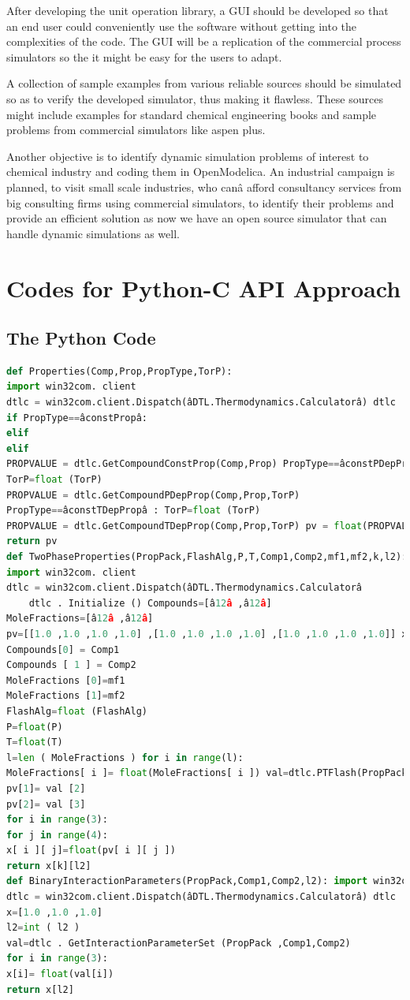 \documentclass[12pt]{report}
\begin{document}
After developing the unit operation library, a GUI should be developed so that an end user could conveniently use the software without getting into the complexities of the code. The GUI will be a replication of the commercial process simulators so the it might be easy for the users to adapt.

A collection of sample examples from various reliable sources should be simulated so as to verify the developed simulator, thus making it flawless. These sources might include examples for standard chemical engineering books and sample problems from commercial simulators like aspen plus.

Another objective is to identify dynamic simulation problems of interest to chemical industry and coding them in OpenModelica. An industrial campaign is planned, to visit small scale industries, who canâ  afford consultancy services from big consulting firms using commercial simulators, to identify their problems and provide an efficient solution as now we have an open source simulator that can handle dynamic simulations as well.

\appendix
\chapter{Codes for Python-C API Approach}
\label{appenA}
\section{The Python Code}
\begin{lstlisting}[language=Python]
def Properties(Comp,Prop,PropType,TorP):
import win32com. client
dtlc = win32com.client.Dispatch(âDTL.Thermodynamics.Calculatorâ) dtlc . Initialize ()
if PropType==âconstPropâ:
elif
elif
PROPVALUE = dtlc.GetCompoundConstProp(Comp,Prop) PropType==âconstPDepPropâ :
TorP=float (TorP)
PROPVALUE = dtlc.GetCompoundPDepProp(Comp,Prop,TorP)
PropType==âconstTDepPropâ : TorP=float (TorP)
PROPVALUE = dtlc.GetCompoundTDepProp(Comp,Prop,TorP) pv = float(PROPVALUE)
return pv
def TwoPhaseProperties(PropPack,FlashAlg,P,T,Comp1,Comp2,mf1,mf2,k,l2):
import win32com. client
dtlc = win32com.client.Dispatch(âDTL.Thermodynamics.Calculatorâ
	dtlc . Initialize () Compounds=[â12â ,â12â]
MoleFractions=[â12â ,â12â]
pv=[[1.0 ,1.0 ,1.0 ,1.0] ,[1.0 ,1.0 ,1.0 ,1.0] ,[1.0 ,1.0 ,1.0 ,1.0]] x=[[1.0 ,1.0 ,1.0 ,1.0] ,[1.0 ,1.0 ,1.0 ,1.0] ,[1.0 ,1.0 ,1.0,1.0]] 
Compounds[0] = Comp1
Compounds [ 1 ] = Comp2
MoleFractions [0]=mf1
MoleFractions [1]=mf2
FlashAlg=float (FlashAlg)
P=float(P)
T=float(T)
l=len ( MoleFractions ) for i in range(l):
MoleFractions[ i ]= float(MoleFractions[ i ]) val=dtlc.PTFlash(PropPack, FlashAlg, P, T,Compounds, MoleFractio pv[0] = val[1]
pv[1]= val [2]
pv[2]= val [3]
for i in range(3):
for j in range(4):
x[ i ][ j]=float(pv[ i ][ j ])
return x[k][l2]
def BinaryInteractionParameters(PropPack,Comp1,Comp2,l2): import win32com. client
dtlc = win32com.client.Dispatch(âDTL.Thermodynamics.Calculatorâ) dtlc . Initialize ()
x=[1.0 ,1.0 ,1.0]
l2=int ( l2 )
val=dtlc . GetInteractionParameterSet (PropPack ,Comp1,Comp2)
for i in range(3):
x[i]= float(val[i])
return x[l2]
\end{lstlisting}
\end{document}

